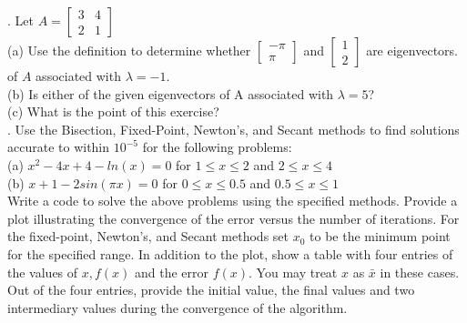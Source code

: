 \documentclass{article} %
\begin{document}
{    . Let $ A = \begin{bmatrix} 3 & 4 \\ 2 & 1 \end{bmatrix} $ \\ %
    (a) Use the definition to determine whether $ \begin{bmatrix} -\pi \\ \pi \end{bmatrix} $ and $ \begin{bmatrix} 1 \\ 2 \end{bmatrix} $
    are eigenvectors. of $ A $ associated with $ \lambda = -1 $. \\
    (b) Is either of the given eigenvectors of A associated with $ \lambda = 5 $? \\
    (c) What is the point of this exercise? \\

    . Use the Bisection, Fixed-Point, Newton’s, and Secant methods to find solutions accurate to within 
    $ 10^{-5} $ for the following problems: \\
    (a) $ x^2 - 4x + 4 - ln(x) = 0 $ for $ 1 \leq x \leq 2 $ and $ 2 \leq x \leq 4 $ \\
    (b) $ x + 1 - 2sin(\pi x) = 0 $ for $ 0 \leq x \leq 0.5 $ and $ 0.5 \leq x \leq 1 $ \\
    Write a code to solve the above problems using the specified methods. Provide a plot illustrating the
    convergence of the error versus the number of iterations. For the fixed-point, Newton’s, and Secant
    methods set $ x_0 $ to be the minimum point for the specified range. In addition to the plot, show a table
    with four entries of the values of $ x, f(x) $ and the error $ f(x) $. You may treat $ x $ as $ \bar{x} $ in these cases. Out
    of the four entries, provide the initial value, the final values and two intermediary values during the
    convergence of the algorithm. \\

}
\end{document}
